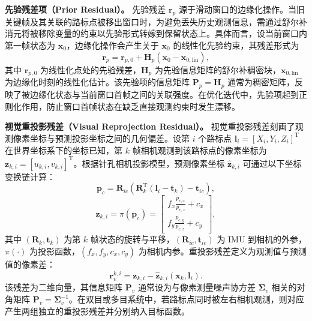 \textbf{先验残差项（Prior Residual）。}
先验残差 $\mathbf{r}_p$ 源于滑动窗口的边缘化操作。当旧关键帧及其关联的路标点被移出窗口时，为避免丢失历史观测信息，需通过舒尔补消元将被移除变量的约束以先验形式转嫁到保留状态上。具体而言，设当前窗口内第一帧状态为 $\mathbf{x}_0$，边缘化操作会产生关于 $\mathbf{x}_0$ 的线性化先验约束，其残差形式为
\begin{equation}
    \mathbf{r}_p = \mathbf{r}_{p,0} + \mathbf{H}_p(\mathbf{x}_0-\mathbf{x}_{0,\mathrm{lin}}),
\end{equation}
其中 $\mathbf{r}_{p,0}$ 为线性化点处的先验残差，$\mathbf{H}_p$ 为先验信息矩阵的舒尔补稠密块，$\mathbf{x}_{0,\mathrm{lin}}$ 为边缘化时刻的线性化估计。该先验项的信息矩阵 $\mathbf{P}_p=\mathbf{H}_p$ 通常为稠密矩阵，反映了被边缘化状态与当前窗口首帧之间的关联强度。在优化迭代中，先验项起到正则化作用，防止窗口首帧状态在缺乏直接观测约束时发生漂移。

\textbf{视觉重投影残差（Visual Reprojection Residual）。}
视觉重投影残差刻画了观测像素坐标与预测投影坐标之间的几何偏差。设第 $i$ 个路标点 $\mathbf{l}_i=[X_i,Y_i,Z_i]^{\mathrm{T}}$ 在世界坐标系下的坐标已知，第 $k$ 帧相机观测到该路标点的像素坐标为 $\mathbf{z}_{k,i}=[u_{k,i},v_{k,i}]^{\mathrm{T}}$。根据针孔相机投影模型，预测像素坐标 $\hat{\mathbf{z}}_{k,i}$ 可通过以下坐标变换链计算：
\begin{equation}
    \mathbf{p}_c = \mathbf{R}_{ic}\!\left(\mathbf{R}_{k}^{\mathrm{T}}(\mathbf{l}_i-\mathbf{t}_{k})-\mathbf{t}_{ic}\right),
\end{equation}
\begin{equation}
    \hat{\mathbf{z}}_{k,i} = \pi(\mathbf{p}_c) = \begin{bmatrix} f_x\frac{p_{c,x}}{p_{c,z}}+c_x \\ f_y\frac{p_{c,y}}{p_{c,z}}+c_y \end{bmatrix},
\end{equation}
其中 $(\mathbf{R}_{k},\mathbf{t}_{k})$ 为第 $k$ 帧状态的旋转与平移，$(\mathbf{R}_{ic},\mathbf{t}_{ic})$ 为 IMU 到相机的外参，$\pi(\cdot)$ 为投影函数，$(f_x,f_y,c_x,c_y)$ 为相机内参。重投影残差定义为观测值与预测值的像素差：
\begin{equation}
    \mathbf{r}_{v}^{k,i} = \mathbf{z}_{k,i} - \hat{\mathbf{z}}_{k,i}(\mathbf{x}_k,\mathbf{l}_i).
\end{equation}
该残差为二维向量，其信息矩阵 $\mathbf{P}_v$ 通常设为与像素测量噪声协方差 $\mathbf{\Sigma}_v$ 相关的对角矩阵 $\mathbf{P}_v=\mathbf{\Sigma}_v^{-1}$。在双目或多目系统中，若路标点同时被左右相机观测，则对应产生两组独立的重投影残差并分别纳入目标函数。

